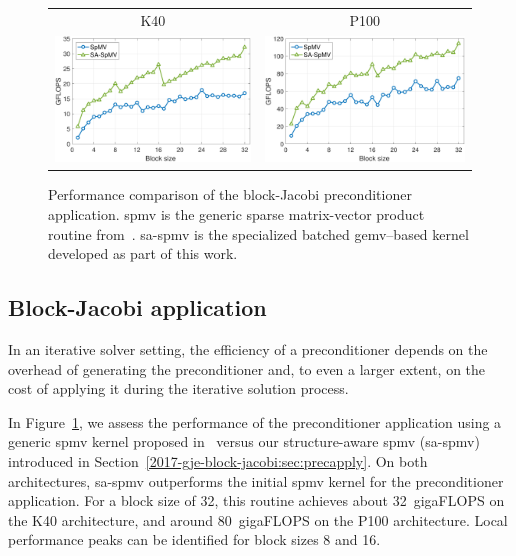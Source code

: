 \begin{figure}
\begin{center}
\begin{tabular}{cc}
K40 & P100\\
\includegraphics[width=.46\columnwidth]{plots/bjp_apply_bs_d_K40.pdf}
&
\includegraphics[width=.46\columnwidth]{plots/bjp_apply_bs_d_P100.pdf}
\end{tabular}
\end{center}
\caption{
Performance comparison of the block-Jacobi preconditioner application.
{\sc spmv} is the generic sparse matrix-vector product routine
from~\cite{Anzt:2017:BGE:3026937.3026940}.
{\sc sa-spmv} is the specialized batched {\sc gemv}--based kernel developed as part of this work.  
}
\label{2017-gje-block-jacobi:fig:precappl}
\end{figure}


\subsection{Block-Jacobi application}


In an iterative solver setting, the efficiency of a preconditioner depends on
the overhead of generating the preconditioner and, to even a larger extent, on
the cost of applying it during the iterative solution process.

In Figure~\ref{2017-gje-block-jacobi:fig:precappl}, we assess the performance of the preconditioner
application using a generic {\sc spmv} kernel proposed
in~\cite{Anzt:2017:BGE:3026937.3026940} versus our structure-aware {\sc spmv}
({\sc sa-spmv}) introduced in Section~\ref{2017-gje-block-jacobi:sec:precapply}. On both architectures,
{\sc sa-spmv} outperforms the initial {\sc spmv} kernel for the preconditioner
application. For a block size of 32, this routine achieves about 32~gigaFLOPS on the K40
architecture, and around 80~gigaFLOPS on the P100 architecture. Local performance peaks
can be identified for block sizes 8 and 16.

